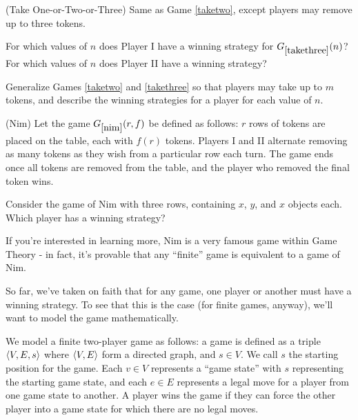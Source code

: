 \begin{game}{(Take One-or-Two-or-Three)}\label{takethree}
Same as Game \ref{taketwo}, except players may remove up to three tokens.
\end{game}

\begin{question}
For which values of $n$ does Player I have a winning strategy for $G_{\ref{takethree}}(n)$? For which values of $n$ does Player II have a winning strategy?
\end{question}

\begin{question}
Generalize Games \ref{taketwo} and \ref{takethree} so that players may take up to $m$ tokens, and describe the winning strategies for a player for each value of $n$.
\end{question}

\begin{game}{(Nim)}\label{nim}
Let the game $G_{\ref{nim}}(r,f)$ be defined as follows: $r$ rows of tokens are placed on the table, each with $f(r)$ tokens. Players I and II alternate removing as many tokens as they wish from a particular row each turn. The game ends once all tokens are removed from the table, and the player who removed the final token wins.
\end{game}

\begin{question}
Consider the game of Nim with three rows, containing $x$, $y$, and $x$ objects each. Which player has a winning strategy?
\end{question}

If you're interested in learning more, Nim is a very famous game within Game Theory - in fact, it's provable that any ``finite'' game is equivalent to a game of Nim.

So far, we've taken on faith that for any game, one player or another must have a winning strategy. To see that this is the case (for finite games, anyway), we'll want to model the game mathematically.

\begin{definition}
We model a finite two-player game as follows: a game is defined as a triple $\langle V,E,s\rangle$ where $\langle V,E\rangle$ form a directed graph, and $s\in V$. We call $s$ the starting position for the game. Each $v\in V$ represents a ``game state'' with $s$ representing the starting game state, and each $e\in E$ represents a legal move for a player from one game state to another. A player wins the game if they can force the other player into a game state for which there are no legal moves.
\end{definition}

